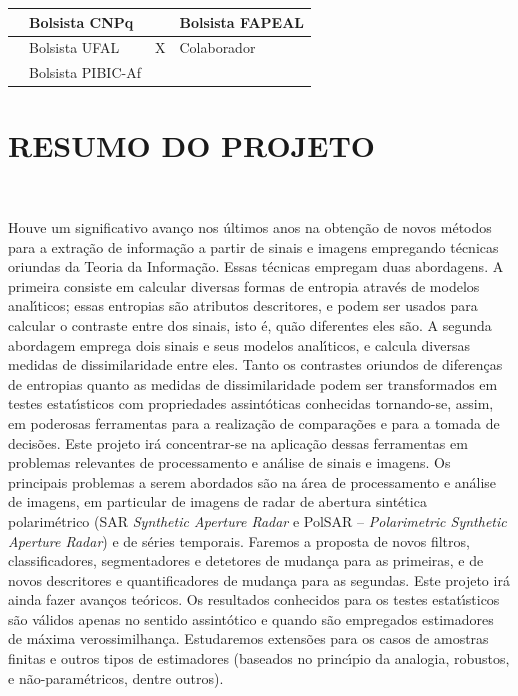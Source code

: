 \documentclass[12pt,letterpaper]{article}
\begin{document}
\begin{table}[!h]
\begin{center}
\begin{tabularx}{\textwidth}{|X|X|X|X|}
\hline                              
& Bolsista CNPq &  &Bolsista FAPEAL\\
\hline             
& Bolsista UFAL & X &Colaborador\\
\hline             
& Bolsista PIBIC-Af&  &\\
\hline     
\end{tabularx}
\end{center}
\end{table}

\hrulefill   


\newpage
\section*{\centering \textbf{RESUMO DO PROJETO}}
\hrulefill \\

\vspace{0.2cm}

Houve um significativo avanço nos últimos anos na obtenção de novos métodos para a extração de informação a partir de sinais e imagens empregando técnicas oriundas da Teoria da Informação. Essas técnicas empregam duas abordagens. A primeira consiste em calcular diversas formas de entropia através de modelos analı́ticos; essas entropias são atributos descritores, e podem ser usados para calcular o contraste entre dos sinais, isto é, quão diferentes eles são. A segunda abordagem emprega dois sinais e seus modelos analı́ticos, e calcula diversas medidas de dissimilaridade entre eles. Tanto os contrastes oriundos de diferenças de entropias quanto as medidas de dissimilaridade podem ser transformados em testes estatı́sticos com propriedades assintóticas conhecidas tornando-se, assim, em poderosas ferramentas para a realização de comparações e para a tomada de decisões. Este projeto irá concentrar-se na aplicação dessas ferramentas em problemas relevantes de processamento e análise de sinais e imagens. Os principais
problemas a serem abordados são na área de processamento e análise de imagens, em particular de imagens de radar de abertura sintética polarimétrico (SAR \textit{Synthetic Aperture Radar} e PolSAR -- \textit{Polarimetric Synthetic Aperture Radar}) e de séries temporais. Faremos a proposta de novos filtros, classificadores, segmentadores e detetores de mudança para as primeiras, e de novos descritores e quantificadores de mudança para as segundas. Este projeto irá ainda fazer avanços teóricos. Os resultados conhecidos para os testes estatı́sticos são válidos apenas no sentido assintótico e quando são empregados estimadores de máxima verossimilhança. Estudaremos extensões para os casos de amostras finitas e outros tipos de estimadores (baseados no princı́pio da analogia, robustos, e não-paramétricos, dentre outros).
\end{document}
